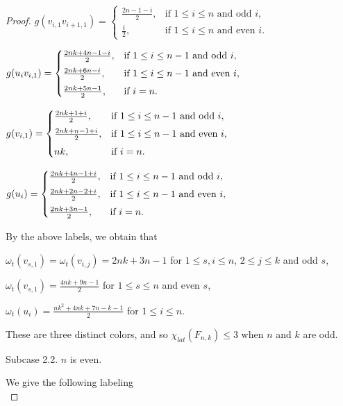 \documentclass[12pt]{article}
\begin{document}
\begin{proof}
$g(v_{i,1}v_{i+1,1})=\begin{cases}
\frac{2n-1-i}{2}, & \text{if $1\leq i\leq n$ and odd $i$},\\[4pt]
\frac{i}{2}, & \text{if $1\leq i\leq n$ and even $i$}. \end{cases}$\vspace{0.5em}

$g(u_{i}v_{i,1})=\begin{cases}
\frac{2nk+4n-1-i}{2}, & \text{if $1\leq i\leq n-1$ and odd $i$},\\[4pt]
\frac{2nk+6n-i}{2}, & \text{if $1\leq i\leq n-1$ and even $i$},\\[4pt]
\frac{2nk+5n-1}{2}, & \text{if $ i= n$}.\end{cases}$\vspace{0.5em}

$g(v_{i,1})=\begin{cases}
\frac{2nk+1+i}{2}, & \text{if $1\leq i\leq n-1$ and odd $i$},\\[4pt]
\frac{2nk+n-1+i}{2}, & \text{if $1\leq i\leq n-1$ and even $i$},\\[4pt]
nk, & \text{if $ i= n$}.\end{cases}$\vspace{0.5em}

$g(u_{i})=\begin{cases}
\frac{2nk+4n-1+i}{2}, & \text{if $1\leq i\leq n-1$ and odd $i$},\\[4pt]
\frac{2nk+2n-2+i}{2}, & \text{if $1\leq i\leq n-1$ and even $i$},\\[4pt]
\frac{2nk+3n-1}{2}, & \text{if $ i= n$}.\end{cases}$\vspace{0.6em}

\noindent By the above labels, we obtain that

$\omega_{t}(v_{s,1})=\omega_{t}(v_{i,j})=2nk+3n-1$ for $1\leq s,i\leq n$, $2\leq j\leq k$ and odd $s$,

$\omega_{t}(v_{s,1})=\frac{4nk+9n-1}{2}$ for $1\leq s\leq n$ and even $s$,

$\omega_{t}(u_{i})=\frac{nk^{2}+4nk+7n-k-1}{2}$ for $1\leq i\leq n$.

\noindent These are three distinct colors, and so $\chi_{lat}(F_{n,k})\leq 3$ when $n$ and $k$ are odd.

Subcase 2.2.  $n$ is even. \vspace{0.4em}

We give the following labeling\\


\end{proof}
\end{document}
